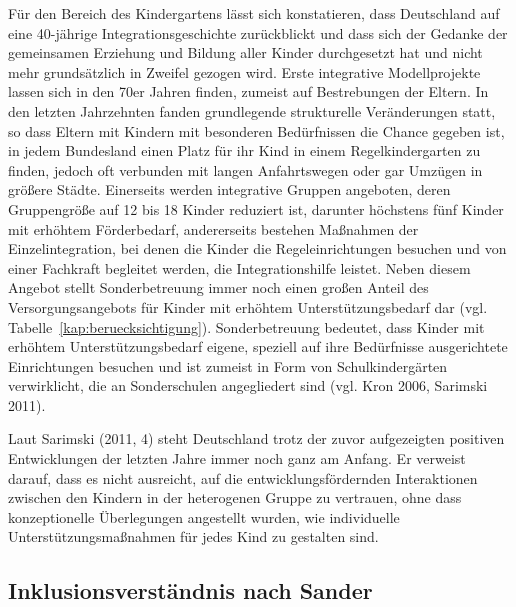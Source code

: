 Für den Bereich des Kindergartens lässt sich konstatieren, dass Deutschland auf eine 40-jährige Integrationsgeschichte zurückblickt und dass sich der Gedanke der gemeinsamen Erziehung und Bildung aller Kinder durchgesetzt hat und nicht mehr grundsätzlich in Zweifel gezogen wird. Erste integrative Modellprojekte lassen sich in den 70er Jahren finden, zumeist auf Bestrebungen der Eltern. In den letzten Jahrzehnten fanden grundlegende strukturelle Veränderungen statt, so dass Eltern mit Kindern mit besonderen Bedürfnissen die Chance gegeben ist, in jedem Bundesland einen Platz für ihr Kind in einem Regelkindergarten zu finden, jedoch oft verbunden mit langen Anfahrtswegen oder gar Umzügen in größere Städte. Einerseits werden integrative Gruppen angeboten, deren Gruppengröße auf 12 bis 18 Kinder reduziert ist, darunter höchstens fünf Kinder mit erhöhtem Förderbedarf, andererseits bestehen Maßnahmen der Einzelintegration, bei denen die Kinder die Regeleinrichtungen besuchen und von einer Fachkraft begleitet werden, die Integrationshilfe leistet. Neben diesem Angebot stellt Sonderbetreuung immer noch einen großen Anteil des Versorgungsangebots für Kinder mit erhöhtem Unterstützungsbedarf dar (vgl. Tabelle~\ref{kap:beruecksichtigung}). Sonderbetreuung bedeutet, dass Kinder mit erhöhtem Unterstützungsbedarf eigene, speziell auf ihre Bedürfnisse 
ausgerichtete Einrichtungen besuchen und ist zumeist in Form von Schulkindergärten verwirklicht, die an Sonderschulen angegliedert sind (vgl. Kron 2006, Sarimski 2011).

Laut Sarimski (2011, 4) steht Deutschland trotz der zuvor aufgezeigten positiven Entwicklungen der letzten Jahre immer noch ganz am Anfang. Er verweist darauf, dass es nicht ausreicht, auf die entwicklungsfördernden Interaktionen zwischen den Kindern in der heterogenen Gruppe zu vertrauen, ohne dass konzeptionelle Überlegungen angestellt wurden, wie individuelle Unterstützungsmaßnahmen für jedes Kind zu gestalten sind.  


\subsection{Inklusionsverständnis nach Sander} 

